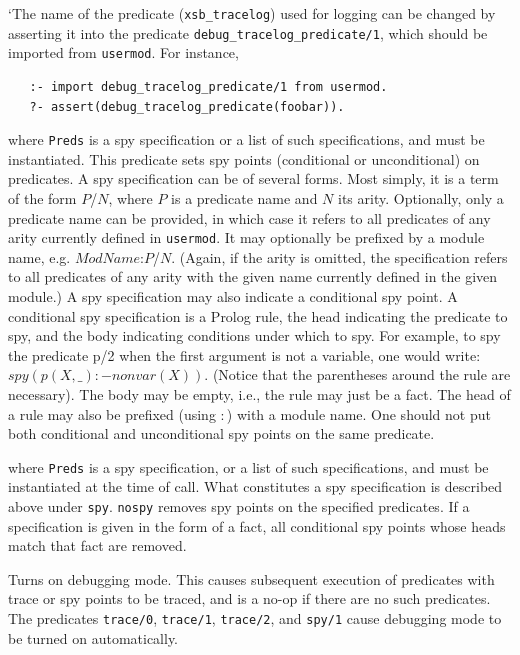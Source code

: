 \begin{description}
`The name of the predicate (\texttt{xsb\_tracelog}) used for logging
can be changed by asserting it into the predicate
\texttt{debug\_tracelog\_predicate/1}, which should be imported from
\texttt{usermod}. For instance,
\begin{verbatim}
   :- import debug_tracelog_predicate/1 from usermod.
   ?- assert(debug_tracelog_predicate(foobar)).
\end{verbatim}

    where {\tt Preds} is a spy specification or a list of such
    specifications, and must be instantiated. This predicate sets spy
    points (conditional or unconditional) on predicates.  A spy
    specification can be of several forms. Most simply, it is a term
    of the form $P$/$N$, where $P$ is a predicate name and $N$ its
    arity.  Optionally, only a predicate name can be provided, in
    which case it refers to all predicates of any arity currently
    defined in {\tt usermod}.  It may optionally be prefixed by a
    module name, e.g.  $ModName$:$P$/$N$. (Again, if the arity is
    omitted, the specification refers to all predicates of any arity
    with the given name currently defined in the given module.)  A spy
    specification may also indicate a conditional spy point. A
    conditional spy specification is a Prolog rule, the head
    indicating the predicate to spy, and the body indicating
    conditions under which to spy. For example, to spy the predicate
    p/2 when the first argument is not a variable, one would write:
    $spy (p(X,\_):-nonvar(X)).$ (Notice that the parentheses around
    the rule are necessary). The body may be empty, i.e., the rule may
    just be a fact.  The head of a rule may also be prefixed (using
    $:$) with a module name. One should not put both conditional and
    unconditional spy points on the same predicate.

    where {\tt Preds} is a spy specification, or a list of such
    specifications, and must be instantiated at the time of call.  What
    constitutes a spy specification is described above under {\tt spy}.
    {\tt nospy} removes spy points on the specified predicates. If a
    specification is given in the form of a fact, all conditional spy points
    whose heads match that fact are removed.

    Turns on debugging mode.
    This causes subsequent execution of predicates with trace or spy
    points to be traced, and is a no-op if there are no such predicates.
    The predicates {\tt trace/0}, {\tt trace/1}, \texttt{trace/2},  and {\tt spy/1} cause debugging mode
    to be turned on automatically.


\end{description}

